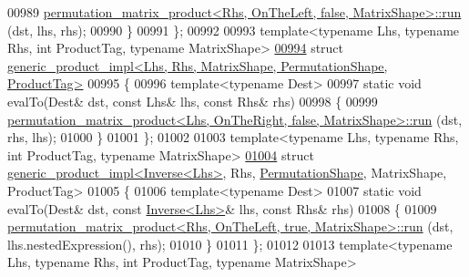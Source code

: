 \begin{DoxyCode}
00989     \hyperlink{struct_eigen_1_1internal_1_1permutation__matrix__product}{permutation\_matrix\_product<Rhs, OnTheLeft, false, MatrixShape>::run}
      (dst, lhs, rhs);
00990   \}
00991 \};
00992 
00993 \textcolor{keyword}{template}<\textcolor{keyword}{typename} Lhs, \textcolor{keyword}{typename} Rhs, \textcolor{keywordtype}{int} ProductTag, \textcolor{keyword}{typename} MatrixShape>
\hyperlink{struct_eigen_1_1internal_1_1generic__product__impl_3_01_lhs_00_01_rhs_00_01_matrix_shape_00_01_p381c4dc3e0472eab95109350dacc6fc1}{00994} \textcolor{keyword}{struct }\hyperlink{struct_eigen_1_1internal_1_1generic__product__impl_3_01_lhs_00_01_rhs_00_01_matrix_shape_00_01_p381c4dc3e0472eab95109350dacc6fc1}{generic\_product\_impl<Lhs, Rhs, MatrixShape, PermutationShape, ProductTag>}
00995 \{
00996   \textcolor{keyword}{template}<\textcolor{keyword}{typename} Dest>
00997   \textcolor{keyword}{static} \textcolor{keywordtype}{void} evalTo(Dest& dst, \textcolor{keyword}{const} Lhs& lhs, \textcolor{keyword}{const} Rhs& rhs)
00998   \{
00999     \hyperlink{struct_eigen_1_1internal_1_1permutation__matrix__product}{permutation\_matrix\_product<Lhs, OnTheRight, false, MatrixShape>::run}
      (dst, rhs, lhs);
01000   \}
01001 \};
01002 
01003 \textcolor{keyword}{template}<\textcolor{keyword}{typename} Lhs, \textcolor{keyword}{typename} Rhs, \textcolor{keywordtype}{int} ProductTag, \textcolor{keyword}{typename} MatrixShape>
\hyperlink{struct_eigen_1_1internal_1_1generic__product__impl_3_01_inverse_3_01_lhs_01_4_00_01_rhs_00_01_pec7dcfbcd610060a544651ed47d5cce0c}{01004} \textcolor{keyword}{struct }\hyperlink{struct_eigen_1_1internal_1_1generic__product__impl}{generic\_product\_impl<Inverse<Lhs>}, Rhs, 
      \hyperlink{struct_eigen_1_1_permutation_shape}{PermutationShape}, MatrixShape, ProductTag>
01005 \{
01006   \textcolor{keyword}{template}<\textcolor{keyword}{typename} Dest>
01007   \textcolor{keyword}{static} \textcolor{keywordtype}{void} evalTo(Dest& dst, \textcolor{keyword}{const} \hyperlink{class_eigen_1_1_inverse}{Inverse<Lhs>}& lhs, \textcolor{keyword}{const} Rhs& rhs)
01008   \{
01009     \hyperlink{struct_eigen_1_1internal_1_1permutation__matrix__product}{permutation\_matrix\_product<Rhs, OnTheLeft, true, MatrixShape>::run}
      (dst, lhs.nestedExpression(), rhs);
01010   \}
01011 \};
01012 
01013 \textcolor{keyword}{template}<\textcolor{keyword}{typename} Lhs, \textcolor{keyword}{typename} Rhs, \textcolor{keywordtype}{int} ProductTag, \textcolor{keyword}{typename} MatrixShape>

\end{DoxyCode}

